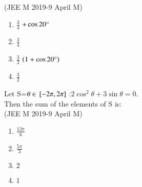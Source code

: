 \hfill {(JEE M 2019-9 April M)}\\
\begin{enumerate}
\item $\frac{3}{4}$ $+\cos20\degree$
\item $\frac{3}{4}$\\
 \item $\frac{3}{2}$ $\left(1+\cos20\degree\right)$ 
 \item $\frac{3}{2}$\\
 \end{enumerate}
\item Let S=$\theta \in {}\left[-2\pi, 2\pi\right]$ :$2\cos^2\theta + 3\sin\theta=0.$\\
 Then the sum of the elements of S is:\\
 
\hfill {(JEE M 2019-9 April M)}\\
\begin{enumerate}
\item $\frac{13\pi}{6}$ 
\item $\frac{5\pi}{3}$
 \item $2$
 \item $1$\\
\end{enumerate} 
